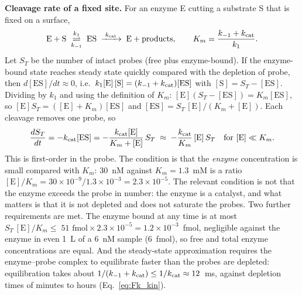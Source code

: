 \documentclass[10pt,a4paper]{article}
\numberwithin{equation}{section}
\newcommand{\nProbesFmol}{51}
\begin{document}
\textbf{Cleavage rate of a fixed site.} For an enzyme E cutting a substrate S that is fixed on a surface,
\[
  \mathrm{E}+\mathrm{S}\;\underset{k_{-1}}{\overset{k_1}{\rightleftharpoons}}\;\mathrm{ES}\;\xrightarrow{\;k_{\rm cat}\;}\;\mathrm{E}+\text{products},
  \qquad K_m=\frac{k_{-1}+k_{\rm cat}}{k_1}.
\]
Let $S_T$ be the number of intact probes (free plus enzyme-bound). If the enzyme-bound state reaches steady
state quickly compared with the depletion of probe, then $d[\mathrm{ES}]/dt\approx0$, i.e.\
$k_1[\mathrm{E}]\,[\mathrm{S}]=(k_{-1}+k_{\rm cat})[\mathrm{ES}]$ with $[\mathrm{S}]=S_T-[\mathrm{ES}]$. Dividing by $k_1$ and using the definition
of $K_m$: $[\mathrm{E}](S_T-[\mathrm{ES}])=K_m[\mathrm{ES}]$, so $[\mathrm{E}]S_T=([\mathrm{E}]+K_m)[\mathrm{ES}]$ and
$[\mathrm{ES}]=S_T\,[\mathrm{E}]/(K_m+[\mathrm{E}])$.
Each cleavage removes one probe, so
\begin{equation}
  \frac{dS_T}{dt}=-k_{\rm cat}[\mathrm{ES}]=-\frac{k_{\rm cat}[\mathrm{E}]}{K_m+[\mathrm{E}]}\,S_T
  \;\approx\;-\frac{k_{\rm cat}}{K_m}\,[\mathrm{E}]\,S_T
  \quad\text{for }[\mathrm{E}]\ll K_m.
  \label{eq:mm}
\end{equation}
This is first-order in the probe. The condition is that the \emph{enzyme} concentration is small compared
with $K_m$: 30~nM against $K_m=1.3$~mM is a ratio $[\mathrm{E}]/K_m=30\times10^{-9}/1.3\times10^{-3}=2.3\times10^{-5}$. The relevant condition is not that the enzyme
exceeds the probe in number: the enzyme is a catalyst, and what matters is that it is not depleted
and does not saturate the probes. Two further requirements are met. The enzyme bound at any time is at most
$S_T\,[\mathrm{E}]/K_m\le\;\nProbesFmol\text{ fmol}\times2.3\times10^{-5}=1.2\times10^{-3}$~fmol, negligible against the
enzyme in even 1~\textmu L of a 6~nM sample (6~fmol), so free and total enzyme concentrations are equal. And
the steady-state approximation requires the enzyme--probe complex to equilibrate faster than the probes are
depleted: equilibration takes about $1/(k_{-1}+k_{\rm cat})\le1/k_{\rm cat}\approx12$~ms, against depletion times of
minutes to hours (Eq.~\ref{eq:Fk_kin}).
\end{document}
